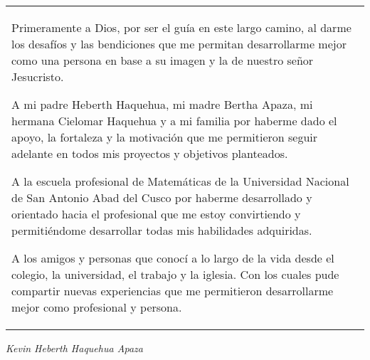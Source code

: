 \begin{dedicatoria}
\begin{flushright}
  \begin{tabular}{p{10cm}}
    Primeramente a Dios, por ser el guía en este largo camino, al darme los desafíos y las bendiciones que me permitan desarrollarme mejor como una persona en base a su imagen y la de nuestro señor Jesucristo.

    A mi padre Heberth Haquehua, mi madre Bertha Apaza, mi hermana Cielomar Haquehua y a mi familia por haberme dado el apoyo, la fortaleza y la motivación que me permitieron seguir adelante en todos mis proyectos y objetivos planteados.

    A la escuela profesional de Matemáticas de la Universidad Nacional de San Antonio Abad del Cusco por haberme desarrollado y orientado hacia el profesional que me estoy convirtiendo y permitiéndome desarrollar todas mis habilidades adquiridas.

    A los amigos y personas que conocí a lo largo de la vida desde el colegio, la universidad, el trabajo y la iglesia. Con los cuales pude compartir nuevas experiencias que me permitieron desarrollarme mejor como profesional y persona.

  \end{tabular}
\vspace{1cm}
  \textsl{Kevin Heberth Haquehua Apaza}
\end{flushright}

\end{dedicatoria}
